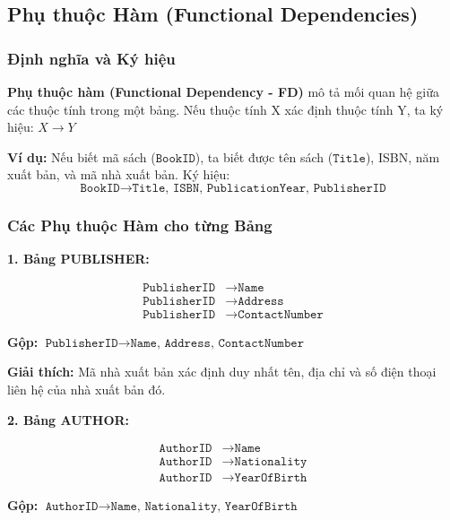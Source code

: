 \documentclass[12pt,a4paper]{article}
\begin{document}
\subsection{Phụ thuộc Hàm (Functional Dependencies)}

\subsubsection{Định nghĩa và Ký hiệu}

\textbf{Phụ thuộc hàm (Functional Dependency - FD)} mô tả mối quan hệ giữa các thuộc tính trong một bảng. Nếu thuộc tính X xác định thuộc tính Y, ta ký hiệu: $X \rightarrow Y$

\textbf{Ví dụ:} Nếu biết mã sách ($\texttt{BookID}$), ta biết được tên sách ($\texttt{Title}$), ISBN, năm xuất bản, và mã nhà xuất bản. Ký hiệu:
$$ \texttt{BookID} \rightarrow \texttt{Title, ISBN, PublicationYear, PublisherID} $$

\subsubsection{Các Phụ thuộc Hàm cho từng Bảng}

\textbf{1. Bảng PUBLISHER:}

$$
\begin{aligned}
\texttt{PublisherID} &\rightarrow \texttt{Name} \\
\texttt{PublisherID} &\rightarrow \texttt{Address} \\
\texttt{PublisherID} &\rightarrow \texttt{ContactNumber}
\end{aligned}
$$

\textbf{Gộp:} $\texttt{PublisherID} \rightarrow \texttt{Name, Address, ContactNumber}$

\textbf{Giải thích:} Mã nhà xuất bản xác định duy nhất tên, địa chỉ và số điện thoại liên hệ của nhà xuất bản đó.

\vspace{0.5cm}

\textbf{2. Bảng AUTHOR:}

$$
\begin{aligned}
\texttt{AuthorID} &\rightarrow \texttt{Name} \\
\texttt{AuthorID} &\rightarrow \texttt{Nationality} \\
\texttt{AuthorID} &\rightarrow \texttt{YearOfBirth}
\end{aligned}
$$

\textbf{Gộp:} $\texttt{AuthorID} \rightarrow \texttt{Name, Nationality, YearOfBirth}$
\end{document}
